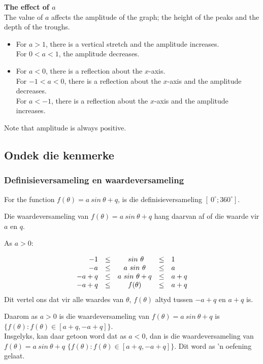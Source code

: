\textbf{The effect of $a$}
\\
The value of $a$ affects the amplitude of the graph; the height of the
peaks and the depth of the troughs.
\begin{itemize}
 \item For $a>1$, there is a vertical stretch and the amplitude increases.\\
For $0<a<1$, the amplitude decreases.
\item For $a<0$, there is a reflection about the $x$-axis.\\ 
For $-1<a<0$, there is a reflection about the $x$-axis and the amplitude decreases.\\
For $a<-1$, there is a reflection about the $x$-axis and the amplitude increases.
\end{itemize}

Note that amplitude is always positive.\\

\subsection*{Ondek die kenmerke}
\subsubsection*{Definisieversameling en waardeversameling}
\nopagebreak
For the function $f(\theta )=a~sin~\theta +q$, is die definisieversameling $[~0^{\circ}; 360^{\circ}]$.\par 
Die waardeversameling van $f(\theta )=a~sin~\theta +q$ hang daarvan af of die waarde vir $a$ en $q$.\par 
As $a>0$:\par 
\nopagebreak\noindent{}
\begin{equation*}
  \begin{array}{rcccl}
    \hfill   -1 & \leq &  ~sin~\theta     & \leq & 1   \hfill \\
    \hfill   -a & \leq & a~sin~\theta     & \leq & a   \hfill \\
    \hfill -a+q & \leq & a~sin~\theta + q & \leq & a+q \hfill \\
    \hfill -a+q & \leq &  f(\theta)      & \leq & a+q \hfill 
  \end{array}
\end{equation*}
Dit vertel ons dat vir alle waardes van $\theta $, $f(\theta )$ altyd tussen $-a+q$ en $a+q$ is.\par
Daarom as $a>0$ is die waardeversameling van  $f(\theta )=a~sin~\theta +q$ is $\{f(\theta ):f(\theta )\in [a+q,-a+q]\}$.\\
Insgelyks, kan daar getoon word dat as $a<0$, dan is die waardeversameling van $f(\theta )=a~sin~\theta +q$ $\{f(\theta ):f(\theta )\in [a+q,-a+q]\}$. Dit word as ’n oefening gelaat.\par 

